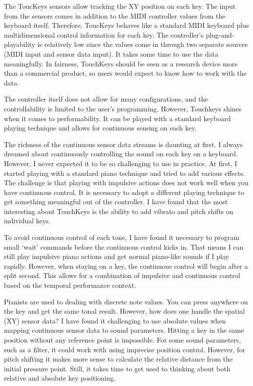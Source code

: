 The ToucKeys sensors allow tracking the XY position on each key. The input from the sensors comes in addition to the MIDI controller values from the keyboard itself. Therefore, ToucKeys behaves like a standard MIDI keyboard plus multidimensional control information for each key. The controller's plug-and-playability is relatively low since the values come in through two separate sources (MIDI input and sensor data input). It takes some time to use the data meaningfully. In fairness, TouchKeys should be seen as a research device more than a commercial product, so users would expect to know how to work with the data.

The controller itself does not allow for many configurations, and the controllability is limited to the user's programming. However, Touchkeys shines when it comes to performability. It can be played with a standard keyboard playing technique and allows for continuous sensing on each key.

The richness of the continuous sensor data streams is daunting at first. I always dreamed about continuously controlling the sound on each key on a keyboard. However, I never expected it to be so challenging to use in practice. At first, I started playing with a standard piano technique and tried to add various effects. The challenge is that playing with impulsive actions does not work well when you have continuous control. It is necessary to adopt a different playing technique to get something meaningful out of the controller.
I have found that the most interesting about TouchKeys is the ability to add vibrato and pitch shifts on individual keys.

To avoid continuous control of each tone, I have found it necessary to program small `wait' commands before the continuous control kicks in. That means I can still play impulsive piano actions and get normal piano-like sounds if I play rapidly. However, when staying on a key, the continuous control will begin after a split second. This allows for a combination of impulsive and continuous control based on the temporal performance context.

Pianists are used to dealing with discrete note values. You can press anywhere on the key and get the same tonal result. However, how does one handle the spatial (XY) sensor data? I have found it challenging to use absolute values when mapping continuous sensor data to sound parameters. Hitting a key in the same position without any reference point is impossible. For some sound parameters, such as a filter, it could work with using imprecise position control. However, for pitch shifting it makes more sense to calculate the relative distance from the initial pressure point. Still, it takes time to get used to thinking about both relative and absolute key positioning.

